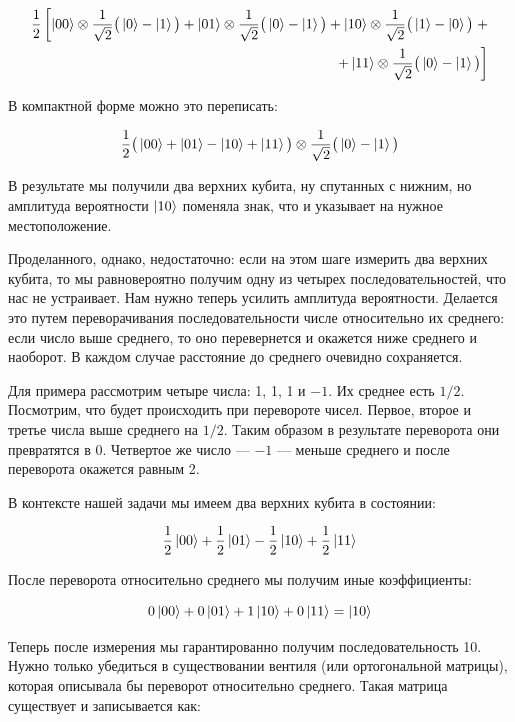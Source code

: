 \documentclass[a4paper, 12pt]{article}
\begin{document}
\begin{align*}
	\frac{1}{2}\left[\ket{00} \otimes \frac{1}{\sqrt{2}}\big(\ket{0} - \ket{1} \big) + \ket{01} \otimes \frac{1}{\sqrt{2}}\big(\ket{0} - \ket{1} \big) + \ket{10} \otimes \frac{1}{\sqrt{2}}\big(\ket{1} - \ket{0} \big)\right. + \\
	\left.+ \ket{11} \otimes \frac{1}{\sqrt{2}}\big(\ket{0} - \ket{1} \big)\right]
\end{align*}

В компактной форме можно это переписать:

\begin{equation}
	\frac{1}{2}\big( \ket{00} + \ket{01} - \ket{10} + \ket{11}\big) \otimes \frac{1}{\sqrt{2}} \big(\ket{0} - \ket{1}\big)
\end{equation}

В результате мы получили два верхних кубита, ну спутанных с нижним, но амплитуда вероятности $\ket{10}$ поменяла знак, что и указывает на нужное местоположение.

Проделанного, однако, недостаточно: если на этом шаге измерить два верхних кубита, то мы равновероятно получим одну из четырех последовательностей, что нас не устраивает. Нам нужно теперь усилить амплитуда вероятности. Делается это путем переворачивания последовательности числе относительно их среднего: если число выше среднего, то оно перевернется и окажется ниже среднего и наоборот. В каждом случае расстояние до среднего очевидно сохраняется.

Для примера рассмотрим четыре числа: 1, 1, 1 и $-1$. Их среднее есть $1/2$. Посмотрим, что будет происходить при перевороте чисел. Первое, второе и третье числа выше среднего на $1/2$. Таким образом в результате переворота они превратятся в 0. Четвертое же число --- $-1$ --- меньше среднего и после переворота окажется равным 2.

В контексте нашей задачи мы имеем два верхних кубита в состоянии:

\begin{equation}
	\frac{1}{2}\ket{00} + \frac{1}{2}\ket{01} - \frac{1}{2}\ket{10} + \frac{1}{2}\ket{11}
	\label{sost}
\end{equation}

После переворота относительно среднего мы получим иные коэффициенты:

\begin{equation}
	0 \ket{00} + 0 \ket{01} + 1 \ket{10} + 0\ket{11} = \ket{10}
\end{equation}

Теперь после измерения мы гарантированно получим последовательность 10. Нужно только убедиться в существовании вентиля (или ортогональной матрицы), которая описывала бы переворот относительно среднего. Такая матрица существует и записывается как:
\end{document}
